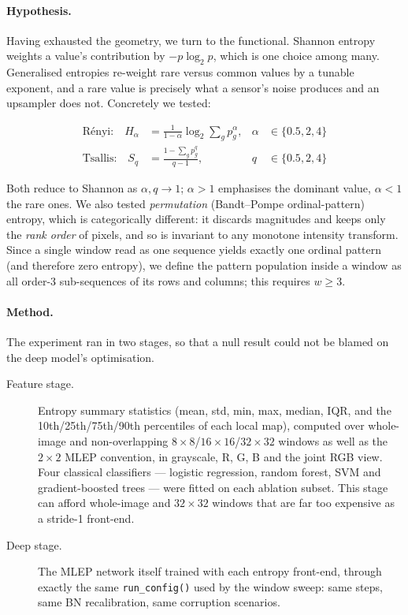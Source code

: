 \paragraph{Hypothesis.} Having exhausted the geometry, we turn to the
functional. Shannon entropy weights a value's contribution by $-p\log_2 p$,
which is one choice among many. Generalised entropies re-weight rare versus
common values by a tunable exponent, and a rare value is precisely what a
sensor's noise produces and an upsampler does not. Concretely we tested:

\begin{align}
  \text{Rényi:}   \quad H_\alpha &= \frac{1}{1-\alpha}\log_2 \sum_g p_g^{\alpha},
  & \alpha &\in \{0.5, 2, 4\} \label{eq:renyi}\\
  \text{Tsallis:} \quad S_q      &= \frac{1 - \sum_g p_g^{q}}{q-1},
  & q &\in \{0.5, 2, 4\} \label{eq:tsallis}
\end{align}

Both reduce to Shannon as $\alpha, q \to 1$; $\alpha > 1$ emphasises the
dominant value, $\alpha < 1$ the rare ones. We also tested \emph{permutation}
(Bandt--Pompe ordinal-pattern) entropy, which is categorically different: it
discards magnitudes and keeps only the \emph{rank order} of pixels, and so is
invariant to any monotone intensity transform. Since a single window read as one
sequence yields exactly one ordinal pattern (and therefore zero entropy), we
define the pattern population inside a window as all order-3 sub-sequences of
its rows and columns; this requires $w \geq 3$.

\paragraph{Method.} The experiment ran in two stages, so that a null result
could not be blamed on the deep model's optimisation.

\begin{description}
  \item[Feature stage.] Entropy summary statistics (mean, std, min, max, median,
    IQR, and the 10th/25th/75th/90th percentiles of each local map), computed
    over whole-image and non-overlapping $8\times8$/$16\times16$/$32\times32$
    windows as well as the $2\times2$ MLEP convention, in grayscale, R, G, B and
    the joint RGB view. Four classical classifiers --- logistic regression,
    random forest, SVM and gradient-boosted trees --- were fitted on each
    ablation subset. This stage can afford whole-image and $32\times32$ windows
    that are far too expensive as a stride-1 front-end.
  \item[Deep stage.] The MLEP network itself trained with each entropy
    front-end, through exactly the same \texttt{run\_config()} used by the window
    sweep: same steps, same BN recalibration, same corruption scenarios.
\end{description}

